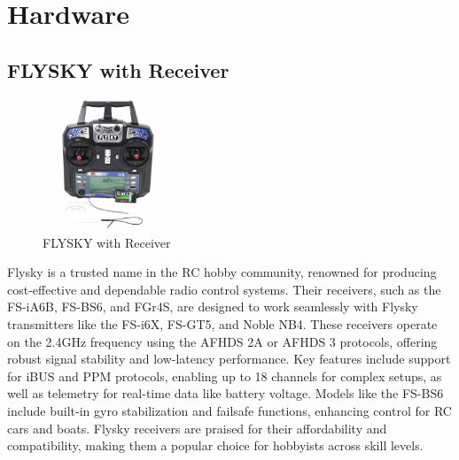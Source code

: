 \section{Hardware}
\subsection{FLYSKY with Receiver}
\begin{figure}[H]
\centering
\includegraphics[width=0.35\textwidth]{images/flysky with receiver.jpg}
\caption{FLYSKY with Receiver}
\end{figure}
Flysky is a trusted name in the RC hobby community, renowned for producing cost-effective and dependable radio control systems. Their receivers, such as the FS-iA6B, FS-BS6, and FGr4S, are designed to work seamlessly with Flysky transmitters like the FS-i6X, FS-GT5, and Noble NB4. These receivers operate on the 2.4GHz frequency using the AFHDS 2A or AFHDS 3 protocols, offering robust signal stability and low-latency performance. Key features include support for iBUS and PPM protocols, enabling up to 18 channels for complex setups, as well as telemetry for real-time data like battery voltage. Models like the FS-BS6 include built-in gyro stabilization and failsafe functions, enhancing control for RC cars and boats. Flysky receivers are praised for their affordability and compatibility, making them a popular choice for hobbyists across skill levels.


